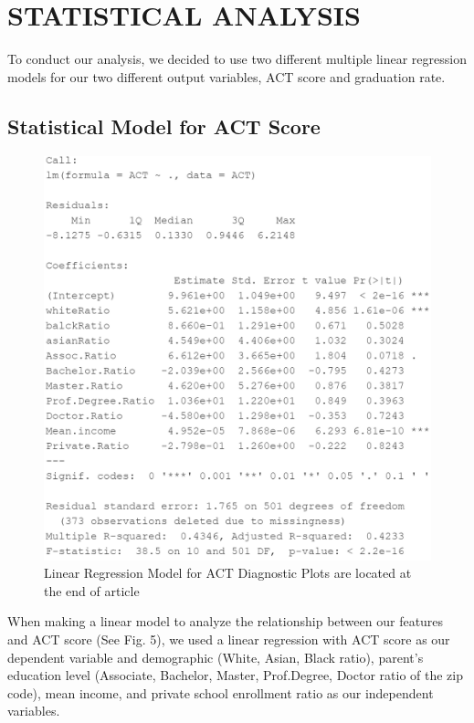 \documentclass[letterpaper, 10 pt, conference]{ieeeconf}  %
\begin{document}
\section{STATISTICAL ANALYSIS}

To conduct our analysis, we decided to use two different multiple linear regression models for our two different output variables, ACT score and graduation rate. 

\subsection{Statistical Model for ACT Score}

\begin{figure}[h]
\begin{center}
\includegraphics[width=1.0\linewidth]{Summary_ACT_All.PNG}
\end{center}
\caption{Linear Regression Model for ACT
  \newline Diagnostic Plots are located at the end of article}
\label{fig:long}
\label{fig:onecol}
\end{figure}

When making a linear model to analyze the relationship between our features and ACT score (See Fig. 5), we used a linear regression with ACT score as our dependent variable and demographic (White, Asian, Black ratio), parent's education level (Associate, Bachelor, Master, Prof.Degree, Doctor ratio of the zip code), mean income, and private school enrollment ratio as our independent variables.
\end{document}
